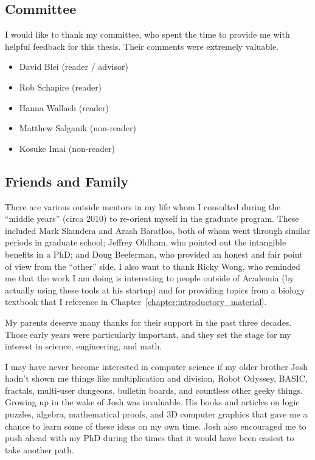 \subsection*{Committee}
I would like to thank my committee, who spent the time to provide me
with helpful feedback for this thesis.  Their comments were extremely valuable.
\begin{itemize}
  \item David Blei (reader / advisor)
  \item Rob Schapire (reader)
  \item Hanna Wallach (reader)
  \item Matthew Salganik (non-reader)
  \item Kosuke Imai (non-reader)
\end{itemize}

\subsection*{Friends and Family}

There are various outside mentors in my life whom I consulted during
the ``middle years'' (circa 2010) to re-orient myself in the graduate
program. These included Mark Skandera and Arash Baratloo, both of whom
went through similar periods in graduate school; Jeffrey Oldham, who
pointed out the intangible benefits in a PhD; and Doug Beeferman, who
provided an honest and fair point of view from the ``other'' side.  I
also want to thank Ricky Wong, who reminded me that the work I am
doing is interesting to people outside of Academia (by actually using
these tools at his startup) and for providing topics from a biology
textbook that I reference in
Chapter~\ref{chapter:introductory_material}.

My parents deserve many thanks for their support in the past three
decades.  Those early years were particularly important, and they set
the stage for my interest in science, engineering, and math.

I may have never become interested in computer science if my older
brother Josh hadn't shown me things like multiplication and division,
Robot Odyssey, BASIC, fractals, multi-user dungeons, bulletin boards,
and countless other geeky things.  Growing up in the wake of Josh was
invaluable.  His books and articles on logic puzzles, algebra,
mathematical proofs, and 3D computer graphics that gave me a chance to
learn some of these ideas on my own time.  Josh also encouraged me to
push ahead with my PhD during the times that it would have been
easiest to take another path.

